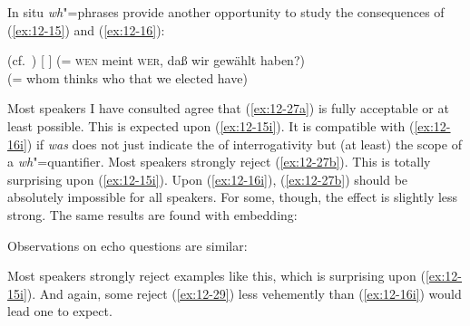 \documentclass[output=paper]{langsci/langscibook}
\begin{document}
In situ \emph{wh}"=phrases provide another opportunity to study the consequences of
(\ref{ex:12-15}) and (\ref{ex:12-16}):
\begin{exe}
\ex
\label{ex:12-27}
\begin{xlist}
\trans\strut\hfill (cf.\ \citealt[153, (79b)]{McDaniel1986})
\exi{}[ ]{
\gll
(= \textsc{wen} meint \textsc{wer}, daß wir gewählt haben?) \\
(= whom thinks who that we elected have)\\}
\end{xlist}
\end{exe}
Most speakers I have consulted agree that (\ref{ex:12-27a}) is fully acceptable or at
least possible. This is expected upon (\ref{ex:12-15i}). It is compatible with (\ref{ex:12-16i}) if
\textit{was} does not just indicate the  of interrogativity but (at least) the
scope of a \emph{wh}"=quantifier. Most speakers strongly reject (\ref{ex:12-27b}). This is totally
surprising upon (\ref{ex:12-15i}). Upon (\ref{ex:12-16i}), (\ref{ex:12-27b}) should be absolutely impossible for
all speakers. For some, though, the effect is slightly less strong. The same
results are found with embedding:
\begin{exe}
\ex
\label{ex:12-28}
\begin{xlist}
\end{xlist}
\end{exe}
Observations on echo questions are similar:
\begin{exe}
\end{exe}
Most speakers strongly reject examples like this, which is surprising upon
(\ref{ex:12-15i}). And again, some reject (\ref{ex:12-29}) less vehemently than (\ref{ex:12-16i}) would lead one
to expect.
\end{document}
